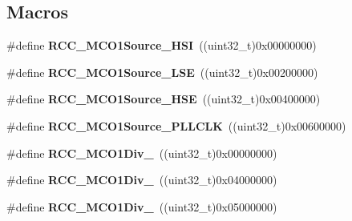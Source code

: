 \subsection*{Macros}
\begin{DoxyCompactItemize}
\item 
\mbox{\label{group___r_c_c___m_c_o1___clock___source___prescaler_ga4ae28483bf1fc780e97740573546602a}} 
\#define {\bfseries R\+C\+C\+\_\+\+M\+C\+O1\+Source\+\_\+\+H\+SI}~((uint32\+\_\+t)0x00000000)
\item 
\mbox{\label{group___r_c_c___m_c_o1___clock___source___prescaler_ga9389beb903be73312e7c75a3f99a05a3}} 
\#define {\bfseries R\+C\+C\+\_\+\+M\+C\+O1\+Source\+\_\+\+L\+SE}~((uint32\+\_\+t)0x00200000)
\item 
\mbox{\label{group___r_c_c___m_c_o1___clock___source___prescaler_gaf9cd71937a147980d41efd3507e3a161}} 
\#define {\bfseries R\+C\+C\+\_\+\+M\+C\+O1\+Source\+\_\+\+H\+SE}~((uint32\+\_\+t)0x00400000)
\item 
\mbox{\label{group___r_c_c___m_c_o1___clock___source___prescaler_gacab701c21ecb3d792aa64188e77a7a7f}} 
\#define {\bfseries R\+C\+C\+\_\+\+M\+C\+O1\+Source\+\_\+\+P\+L\+L\+C\+LK}~((uint32\+\_\+t)0x00600000)
\item 
\mbox{\label{group___r_c_c___m_c_o1___clock___source___prescaler_gac558c2ebb774dc0bcb94dfb94b421a3d}} 
\#define {\bfseries R\+C\+C\+\_\+\+M\+C\+O1\+Div\+\_}~((uint32\+\_\+t)0x00000000)
\item 
\mbox{\label{group___r_c_c___m_c_o1___clock___source___prescaler_gab0247962772ebf1735b7b2a84c235415}} 
\#define {\bfseries R\+C\+C\+\_\+\+M\+C\+O1\+Div\+\_}~((uint32\+\_\+t)0x04000000)
\item 
\mbox{\label{group___r_c_c___m_c_o1___clock___source___prescaler_ga298d00af4cd40822e28a5a20d6cdbfb6}} 
\#define {\bfseries R\+C\+C\+\_\+\+M\+C\+O1\+Div\+\_}~((uint32\+\_\+t)0x05000000)

\end{DoxyCompactItemize}
